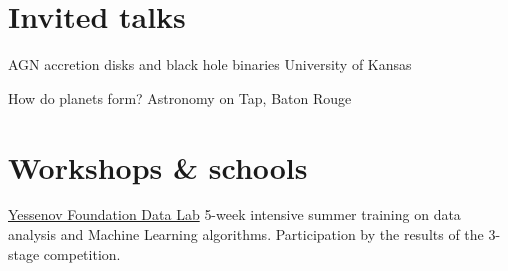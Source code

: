\documentclass[10pt]{article} %
\begin{document}
\begin{paracol}{1}
\section{Invited talks}





	
	
	{AGN accretion disks and black hole binaries}
	{University of Kansas}
	
	
	
	{How do planets form?}
	{Astronomy on Tap, Baton Rouge}


\section{Workshops \& schools}





	
	
	{\href{https://yessenovfoundation.org/en/o-fonde/programmyi/resursyi/razvitie-it-kompetentsiy/yessenov-data-lab-2020/}{Yessenov Foundation Data Lab}}
	{5-week intensive summer training on data analysis and Machine Learning algorithms. Participation by the results of the 3-stage competition.}
	

\end{paracol}
\end{document}
